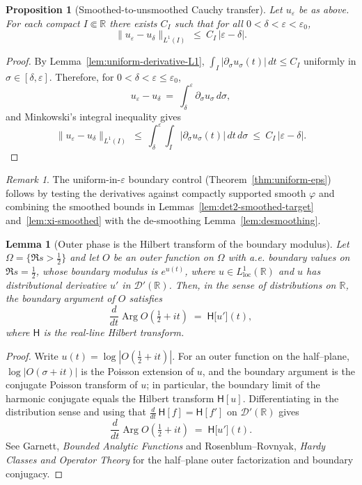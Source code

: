 \documentclass[11pt]{article}
\newtheorem{proposition}[theorem]{Proposition}
\newtheorem{lemma}[theorem]{Lemma}
\theoremstyle{definition}
\theoremstyle{remark}
\newtheorem{remark}[theorem]{Remark}
\newcommand{\R}{\mathbb{R}}
\DeclareMathOperator{\Arg}{Arg}
\begin{document}
\begin{proposition}[Smoothed-to-unsmoothed Cauchy transfer]\label{prop:desmoothing}
Let \(u_\varepsilon\) be as above. For each compact \(I\Subset\R\) there exists \(C_I\) such that for all \(0<\delta<\varepsilon<\varepsilon_0\),
\[
 \|u_\varepsilon-u_\delta\|_{L^1(I)}\ \le\ C_I\,|\varepsilon-\delta|.
\]
\end{proposition}
\begin{proof}
By Lemma~\ref{lem:uniform-derivative-L1}, \(\int_I |\partial_\sigma u_\sigma(t)|\,dt\le C_I\) uniformly in \(\sigma\in[\delta,\varepsilon]\). Therefore, for \(0<\delta<\varepsilon\le\varepsilon_0\),
\[
 u_\varepsilon-u_\delta\ =\ \int_\delta^\varepsilon \partial_\sigma u_\sigma\,d\sigma,
\]
and Minkowski's integral inequality gives
\[
 \|u_\varepsilon-u_\delta\|_{L^1(I)}\ \le\ \int_\delta^\varepsilon\!\int_I |\partial_\sigma u_\sigma(t)|\,dt\,d\sigma\ \le\ C_I\,|\varepsilon-\delta|.
\]
\end{proof}

\begin{remark}
The uniform-in-\(\varepsilon\) boundary control (Theorem~\ref{thm:uniform-eps}) follows by testing the derivatives against compactly supported smooth \(\varphi\) and combining the smoothed bounds in Lemmas~\ref{lem:det2-smoothed-target} and~\ref{lem:xi-smoothed} with the de-smoothing Lemma~\ref{lem:desmoothing}.
\end{remark}

\begin{lemma}[Outer phase is the Hilbert transform of the boundary modulus]\label{lem:outer-phase-HT}
Let \(\Omega=\{\Re s>\tfrac12\}\) and let \(O\) be an outer function on \(\Omega\) with a.e. boundary values on \(\Re s=\tfrac12\), whose boundary modulus is \(e^{u(t)}\), where \(u\in L^1_{\mathrm{loc}}(\R)\) and \(u\) has distributional derivative \(u'\) in \(\mathcal D'(\R)\). Then, in the sense of distributions on \(\R\), the boundary argument of \(O\) satisfies
\[
 \frac{d}{dt}\Arg O\!\left(\tfrac12+it\right)\;=\; \mathsf H\big[u'\big](t),
\]
where \(\mathsf H\) is the real-line Hilbert transform.
\end{lemma}
\begin{proof}
Write \(u(t)=\log|O(\tfrac12+it)|\). For an outer function on the half–plane, \(\log|O(\sigma+it)|\) is the Poisson extension of \(u\), and the boundary argument is the conjugate Poisson transform of \(u\); in particular, the boundary limit of the harmonic conjugate equals the Hilbert transform \(\mathsf H[u]\). Differentiating in the distribution sense and using that \(\tfrac{d}{dt}\,\mathsf H[f]=\mathsf H[f']\) on \(\mathcal D'(\R)\) gives
\[
 \frac{d}{dt}\Arg O\!\left(\tfrac12+it\right)\;=\; \mathsf H\big[u'\big](t).
\]
See Garnett, \emph{Bounded Analytic Functions} \cite[Ch.~II, §2 (Poisson integral), §5 (outer functions)]{Garnett} and Rosenblum–Rovnyak, \emph{Hardy Classes and Operator Theory} \cite[Ch.~2, §3]{RosenblumRovnyak} for the half–plane outer factorization and boundary conjugacy.
\end{proof}
\end{document}
